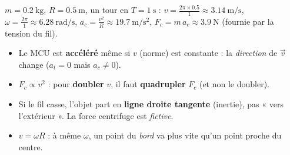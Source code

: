 \documentclass[11pt,a4paper]{article}
\newcommand{\vv}[1]{\vec{#1}}\newcommand{\ds}{\displaystyle}
\begin{document}
\begin{exemplebox}
$m=\qty{0,2}{\kilogram}$, $R=\qty{0,5}{\metre}$, un tour en $T=\qty{1}{\second}$ :
$v=\tfrac{2\pi\times\num{0,5}}{1}\approx\qty{3,14}{\metre\per\second}$,
$\omega=\tfrac{2\pi}{1}\approx\qty{6,28}{\radian\per\second}$,
$a_c=\tfrac{v^2}{R}\approx\qty{19,7}{\metre\per\second\squared}$,
$F_c=m\,a_c\approx\qty{3,9}{\newton}$ (fournie par la tension du fil).
\end{exemplebox}

\begin{piege}
\begin{itemize}[leftmargin=1.4em,topsep=2pt,itemsep=1.5pt]
  \item Le MCU est \textbf{accéléré} même si $v$ (norme) est constante : la \emph{direction} de $\vv v$ change ($a_t=0$ mais $a_c\ne 0$).
  \item $F_c\propto v^2$ : pour \textbf{doubler} $v$, il faut \textbf{quadrupler} $F_c$ (et non le doubler).
  \item Si le fil casse, l'objet part en \textbf{ligne droite tangente} (inertie), pas « vers l'extérieur ». La force centrifuge est \emph{fictive}.
  \item $v=\omega R$ : à même $\omega$, un point du \emph{bord} va plus vite qu'un point proche du centre.
\end{itemize}
\end{piege}
\end{document}
